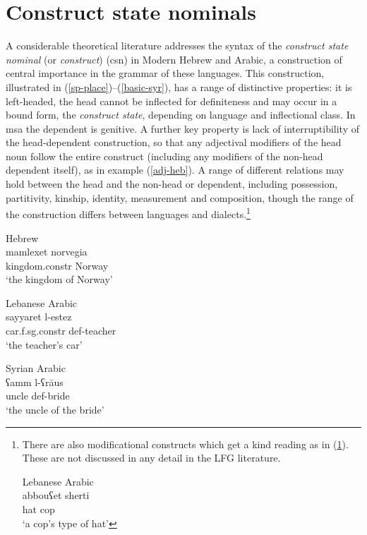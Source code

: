 \documentclass[output=paper,hidelinks]{langscibook}
\begin{document}
\section{Construct state nominals}
\largerpage[-2]
A considerable theoretical literature addresses the syntax of the {\em construct state nominal} (or {\em construct})  ({\sc csn}) in Modern Hebrew and Arabic, a construction of central importance in the grammar of these languages. This construction, illustrated in (\ref{sp-place})--(\ref{basic-syr}), has a range of distinctive properties: it is left-headed, the head cannot be inflected for definiteness and may occur in a bound form,  the {\em construct state}, depending on language and inflectional class. In {\sc msa} the dependent is genitive. A further key property is lack of interruptibility of the head-dependent construction,  so that any adjectival modifiers of the head noun follow the entire construct (including any modifiers of the non-head dependent itself), as in example (\ref{adj-heb}).
A range of different relations may hold between the head and the non-head or dependent, including possession, partitivity, kinship, identity, measurement and composition, though the range of the construction differs between languages and dialects.\footnote{\label{leb-mod}There are also modificational constructs which get a kind reading as in (\ref{ex:Semitic:fn9}).  These are not discussed in any detail in the LFG literature.

\ea\label{ex:Semitic:fn9} Lebanese Arabic \citep[77]{Ouwayda}\\
\gll abbouʕet sherti\\
hat cop\\
\glt `a cop's type of hat'
\z
}



\ea
\label{sp-place} Hebrew \citep[106]{Falk07} \\
\gll mamlexet norvegia\\
kingdom.{\sc constr} Norway\\
\glt `the kingdom of Norway'
\z


\ea \label{car} Lebanese Arabic \citep[77]{Ouwayda}\\
\gll sayyaret l-estez\\
car.{\sc f.sg.constr}  {\sc def}-teacher\\
\glt `the teacher's car'
\z






\ea\label{basic-syr} Syrian Arabic  \citep[258]{Hallman:DOC}\\
\gll  ʕamm l-ʕr\={a}us \\
uncle {\sc def}-bride \\
\glt `the uncle of the bride'
\z
\end{document}
